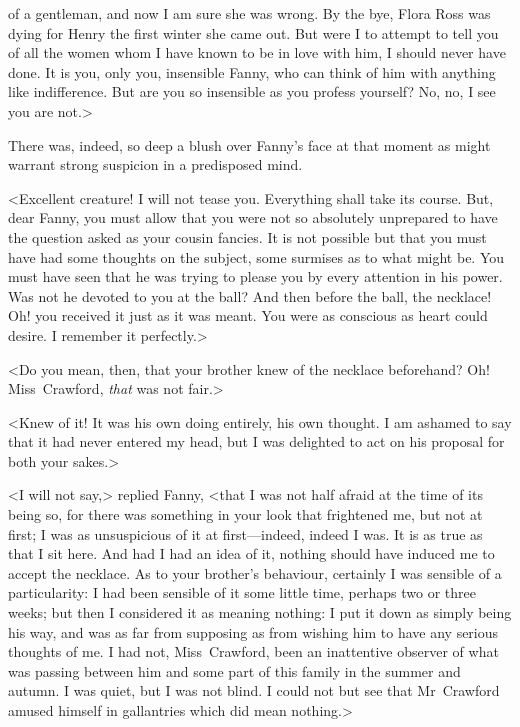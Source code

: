 of a gentleman, and now I am sure she was wrong. By the bye, Flora Ross was dying for Henry the first winter she came out. But were I to attempt to tell you of all the women whom I have known to be in love with him, I should never have done. It is you, only you, insensible Fanny, who can think of him with anything like indifference. But are you so insensible as you profess yourself? No, no, I see you are not.>

There was, indeed, so deep a blush over Fanny's face at that moment as might warrant strong suspicion in a predisposed mind.

<Excellent creature! I will not tease you. Everything shall take its course. But, dear Fanny, you must allow that you were not so absolutely unprepared to have the question asked as your cousin fancies. It is not possible but that you must have had some thoughts on the subject, some surmises as to what might be. You must have seen that he was trying to please you by every attention in his power. Was not he devoted to you at the ball? And then before the ball, the necklace! Oh! you received it just as it was meant. You were as conscious as heart could desire. I remember it perfectly.>

<Do you mean, then, that your brother knew of the necklace beforehand? Oh! Miss~Crawford, \textit{that}  was not fair.>

<Knew of it! It was his own doing entirely, his own thought. I am ashamed to say that it had never entered my head, but I was delighted to act on his proposal for both your sakes.>

<I will not say,> replied Fanny, <that I was not half afraid at the time of its being so, for there was something in your look that frightened me, but not at first; I was as unsuspicious of it at first—indeed, indeed I was. It is as true as that I sit here. And had I had an idea of it, nothing should have induced me to accept the necklace. As to your brother's behaviour, certainly I was sensible of a particularity: I had been sensible of it some little time, perhaps two or three weeks; but then I considered it as meaning nothing: I put it down as simply being his way, and was as far from supposing as from wishing him to have any serious thoughts of me. I had not, Miss~Crawford, been an inattentive observer of what was passing between him and some part of this family in the summer and autumn. I was quiet, but I was not blind. I could not but see that Mr~Crawford amused himself in gallantries which did mean nothing.>

